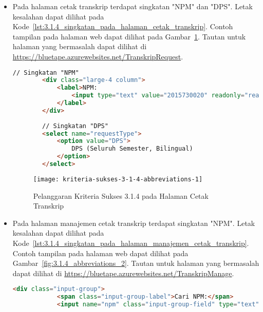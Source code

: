 \begin{itemize}
    \item Pada halaman cetak transkrip terdapat singkatan "NPM" dan "DPS". Letak kesalahan dapat dilihat pada \mbox{Kode \ref{lst:3.1.4_singkatan_pada_halaman_cetak_transkrip}}. Contoh tampilan pada halaman web dapat dilihat pada \mbox{Gambar \ref{fig:3.1.4_abbreviations_1}}. Tautan untuk halaman yang bermasalah dapat dilihat di \url{https://bluetape.azurewebsites.net/TranskripRequest}.
    \begin{lstlisting}[frame=single, label={lst:3.1.4_singkatan_pada_halaman_cetak_transkrip}, language=HTML, caption=Pelanggaran Kriteria Sukses 3.1.4 pada Halaman Cetak Transkrip]
        // Singkatan "NPM"
        <div class="large-4 column">
            <label>NPM:
                <input type="text" value="2015730020" readonly="readonly"/>
            </label>
        </div>
        
        // Singkatan "DPS"
        <select name="requestType">
            <option value="DPS">
                DPS (Seluruh Semester, Bilingual)
            </option>
        </select>
    \end{lstlisting}

    \begin{figure}[H]
        \centering  
        \texttt{[image: kriteria-sukses-3-1-4-abbreviations-1]}  
        \caption[Pelanggaran Kriteria Sukses 3.1.4 pada Halaman Cetak Transkrip]{Pelanggaran Kriteria Sukses 3.1.4 pada Halaman Cetak Transkrip}
        \label{fig:3.1.4_abbreviations_1}  
    \end{figure}

    \item Pada halaman manajemen cetak transkrip terdapat singkatan "NPM". Letak kesalahan dapat dilihat pada \mbox{Kode \ref{lst:3.1.4_singkatan_pada_halaman_manajemen_cetak_transkrip}}. Contoh tampilan pada halaman web dapat dilihat pada \mbox{Gambar \ref{fig:3.1.4_abbreviations_2}}. Tautan untuk halaman yang bermasalah dapat dilihat di \url{https://bluetape.azurewebsites.net/TranskripManage}.
    \begin{lstlisting}[frame=single, label={lst:3.1.4_singkatan_pada_halaman_manajemen_cetak_transkrip}, language=HTML, caption=Pelanggaran Kriteria Sukses 3.1.4 pada Halaman Manajemen Cetak Transkrip]
        <div class="input-group">
            <span class="input-group-label">Cari NPM:</span>
            <input name="npm" class="input-group-field" type="text" placeholder="2013730013" maxlength="10" minlength="10"/>
    \end{lstlisting}


\end{itemize}
